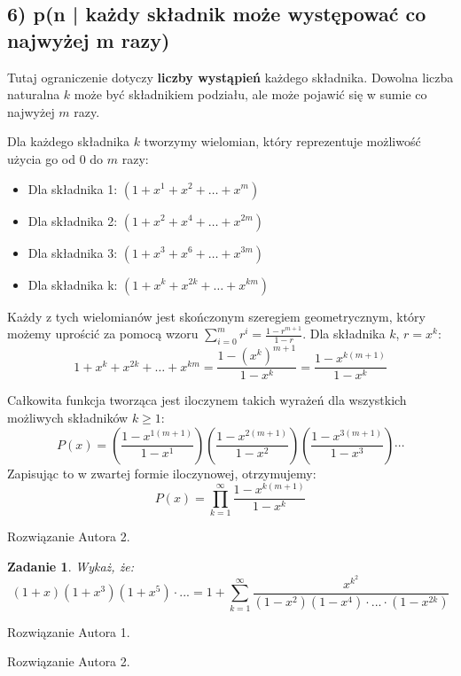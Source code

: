 \documentclass{mwart}
\newtheorem{zad}{Zadanie}[section]
\begin{document}
\begin{mdframed}
    \subsection*{6) p(n | każdy składnik może występować co najwyżej m razy)}

    Tutaj ograniczenie dotyczy \textbf{liczby wystąpień} każdego składnika. Dowolna liczba naturalna $k$ może być składnikiem podziału, ale może pojawić się w sumie co najwyżej $m$ razy.
    
    Dla każdego składnika $k$ tworzymy wielomian, który reprezentuje możliwość użycia go od 0 do $m$ razy:
    \begin{itemize}
        \item Dla składnika 1: $(1 + x^1 + x^2 + \dots + x^m)$
        \item Dla składnika 2: $(1 + x^2 + x^4 + \dots + x^{2m})$
        \item Dla składnika 3: $(1 + x^3 + x^6 + \dots + x^{3m})$
        \item Dla składnika k: $(1 + x^k + x^{2k} + \dots + x^{km})$
    \end{itemize}
    
    Każdy z tych wielomianów jest skończonym szeregiem geometrycznym, który możemy uprościć za pomocą wzoru $\sum_{i=0}^{m} r^i = \frac{1-r^{m+1}}{1-r}$. Dla składnika $k$, $r=x^k$:
    $$ 1 + x^k + x^{2k} + \dots + x^{km} = \frac{1 - (x^k)^{m+1}}{1-x^k} = \frac{1 - x^{k(m+1)}}{1-x^k} $$
    
    Całkowita funkcja tworząca jest iloczynem takich wyrażeń dla wszystkich możliwych składników $k \ge 1$:
    $$ P(x) = \left(\frac{1-x^{1(m+1)}}{1-x^1}\right) \left(\frac{1-x^{2(m+1)}}{1-x^2}\right) \left(\frac{1-x^{3(m+1)}}{1-x^3}\right) \cdots $$
    Zapisując to w zwartej formie iloczynowej, otrzymujemy:
    $$ P(x) = \prod_{k=1}^{\infty} \frac{1 - x^{k(m+1)}}{1-x^k} $$
\end{mdframed}
\begin{mdframed}
    Rozwiązanie Autora 2.
\end{mdframed}



\begin{zad}
    Wykaż, że:
    \[(1+x)(1+x^3)(1+x^5) \cdot ... = 1 + \sum_{k = 1}^{\infty}\frac{x^{k^2}}{(1-x^2)(1-x^4)\cdot ... \cdot (1-x^{2k})}\]
\end{zad}
\begin{mdframed}
    Rozwiązanie Autora 1.
\end{mdframed}
\begin{mdframed}
    Rozwiązanie Autora 2.
\end{mdframed}
\end{document}
